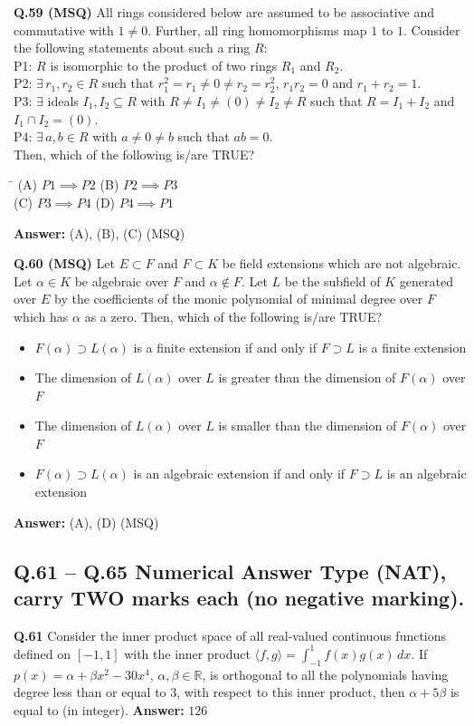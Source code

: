 \documentclass[11pt,a4paper]{article}
\newcommand{\optsfourA}[4]{%
  \begin{tabbing}
    \hspace{0.48\linewidth}\=\kill
    (A) #1 \> (B) #2 \\[2pt]
    (C) #3 \> (D) #4
  \end{tabbing}%
}
\newcommand{\optslistA}[4]{%
  \begin{itemize}
    \setlength{\itemsep}{2pt}\setlength{\parskip}{0pt}
    \item[(A)] #1
    \item[(B)] #2
    \item[(C)] #3
    \item[(D)] #4
  \end{itemize}%
}
\newcommand{\ans}[1]{\textbf{Answer:} #1\par\medskip}
\begin{document}
\textbf{Q.59 (MSQ)} All rings considered below are assumed to be associative and commutative with $1 \ne 0$. Further, all ring homomorphisms map $1$ to $1$. Consider the following statements about such a ring $R$:\\
P1: $R$ is isomorphic to the product of two rings $R_1$ and $R_2$.\\
P2: $\exists \, r_1, r_2 \in R$ such that $r_1^2 = r_1 \ne 0 \ne r_2 = r_2^2$, $r_1 r_2 = 0$ and $r_1 + r_2 = 1$.\\
P3: $\exists$ ideals $I_1, I_2 \subseteq R$ with $R \ne I_1 \ne (0) \ne I_2 \ne R$ such that $R = I_1 + I_2$ and $I_1 \cap I_2 = (0)$.\\
P4: $\exists \, a, b \in R$ with $a \ne 0 \ne b$ such that $ab = 0$.\\
Then, which of the following is/are TRUE?
\optsfourA{$P1 \implies P2$}{$P2 \implies P3$}{$P3 \implies P4$}{$P4 \implies P1$}
\ans{(A), (B), (C) (MSQ)}

\textbf{Q.60 (MSQ)} Let $E \subset F$ and $F \subset K$ be field extensions which are not algebraic. Let $\alpha \in K$ be algebraic over $F$ and $\alpha \notin F$. Let $L$ be the subfield of $K$ generated over $E$ by the coefficients of the monic polynomial of minimal degree over $F$ which has $\alpha$ as a zero. Then, which of the following is/are TRUE?
\optslistA{$F(\alpha) \supset L(\alpha)$ is a finite extension if and only if $F \supset L$ is a finite extension}{The dimension of $L(\alpha)$ over $L$ is greater than the dimension of $F(\alpha)$ over $F$}{The dimension of $L(\alpha)$ over $L$ is smaller than the dimension of $F(\alpha)$ over $F$}{$F(\alpha) \supset L(\alpha)$ is an algebraic extension if and only if $F \supset L$ is an algebraic extension}
\ans{(A), (D) (MSQ)}

\subsection*{Q.61 -- Q.65 Numerical Answer Type (NAT), carry TWO marks each (no negative marking).}

\textbf{Q.61} Consider the inner product space of all real-valued continuous functions defined on $[-1, 1]$ with the inner product $\langle f, g \rangle = \int_{-1}^{1} f(x) g(x)\,dx$. If $p(x) = \alpha + \beta x^2 - 30x^4$, $\alpha, \beta \in \mathbb{R}$, is orthogonal to all the polynomials having degree less than or equal to $3$, with respect to this inner product, then $\alpha + 5\beta$ is equal to \underline{\hspace{2cm}} (in integer).
\ans{$126$}
\end{document}
